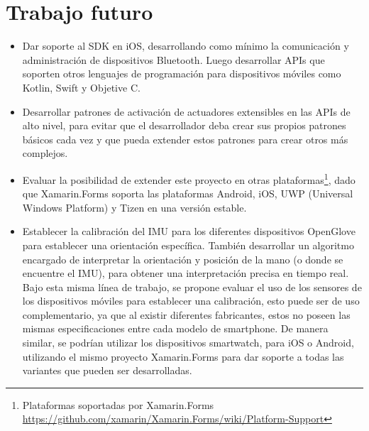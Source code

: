 \section{Trabajo futuro}

\begin{itemize}
	
	\item Dar soporte al SDK en iOS, desarrollando como mínimo la comunicación y administración de dispositivos Bluetooth. Luego desarrollar APIs que soporten otros lenguajes de programación para dispositivos móviles como Kotlin, Swift y Objetive C.
	
	\item Desarrollar patrones de activación de actuadores extensibles en las APIs de alto nivel, para evitar que el desarrollador deba crear sus propios patrones básicos cada vez y que pueda extender estos patrones para crear otros más complejos.
	
	
	\item Evaluar la posibilidad de extender este proyecto en otras plataformas\footnote{Plataformas soportadas por Xamarin.Forms \url{https://github.com/xamarin/Xamarin.Forms/wiki/Platform-Support}}, dado que Xamarin.Forms soporta las plataformas Android, iOS, UWP (Universal Windows Platform)  y Tizen en una versión estable.
	
	\item Establecer la calibración  del IMU para los diferentes dispositivos OpenGlove para establecer una orientación específica. También desarrollar un algoritmo encargado de interpretar la orientación y posición de la mano (o donde se encuentre el IMU), para obtener una interpretación precisa en tiempo real. Bajo esta misma línea de trabajo, se propone evaluar el uso de los sensores de los dispositivos móviles para establecer una calibración, esto puede ser de uso complementario, ya que al existir diferentes fabricantes, estos no poseen las mismas especificaciones entre cada modelo de smartphone. De manera similar, se podrían utilizar los dispositivos smartwatch, para iOS o Android, utilizando el mismo proyecto Xamarin.Forms para dar soporte a todas las variantes que pueden ser desarrolladas.
	

\end{itemize}
